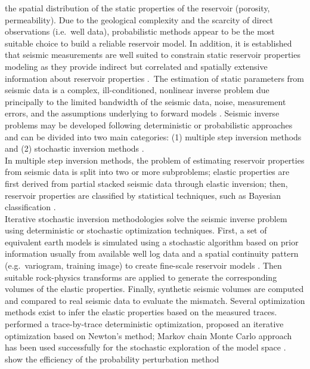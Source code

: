 the spatial distribution of the static properties of the reservoir (porosity,
permeability). Due to the geological complexity and the scarcity of direct
observations (i.e.\ well data), probabilistic methods appear to be the most
suitable choice to build a reliable reservoir model. In addition, it is
established that seismic measurements are well suited to constrain static
reservoir properties modeling as they provide indirect but correlated and
spatially extensive information about reservoir properties \citep{Doyen2007}.\
The estimation of static parameters from seismic data is a complex,
ill-conditioned, nonlinear inverse problem due principally to the limited
bandwidth  of the seismic data, noise, measurement errors,
and  the assumptions underlying to forward models \citep{Tarantola2004}.
Seismic inverse problems may be developed following deterministic or
probabilistic approaches and can be divided into two main categories: (1)
multiple step inversion methods and (2) stochastic inversion methods
\citep{Grana2012}.\\
In multiple step inversion methods, the problem of estimating reservoir
properties from seismic data is split into two or more subproblems; elastic
properties are first derived from partial stacked seismic data through elastic
inversion; then, reservoir properties are classified by statistical techniques,
such as Bayesian classification \citep{Avseth2001,Mukerji2001,Buland2003}.\\
Iterative stochastic inversion methodologies solve the seismic inverse problem
using deterministic or stochastic optimization techniques. First, a set of
equivalent earth models is simulated using a stochastic algorithm based on prior
information usually from available well log data and a spatial continuity
pattern (e.g.\ variogram, training image) to create fine-scale reservoir models
\citep{Bosch2009}. Then suitable rock-physics transforms are applied to generate
the corresponding volumes of the elastic properties. Finally, synthetic seismic
volumes are computed and compared to real seismic data to evaluate the mismatch.
Several optimization methods exist to infer the elastic properties based on the
measured traces. \citet{Gonzalez2008} performed a trace-by-trace deterministic
optimization, \citet{Bosch2009} proposed an iterative optimization based on
Newton's method; Markov chain Monte Carlo approach has been used successfully
for the stochastic exploration of the model space
\citep{Eidsvik2004,Larsen2006,Gunning2007,Rimstad2010,Ulvmoen2010,Hansen2012}.
\citet{Grana2012} show the efficiency of the probability perturbation method
